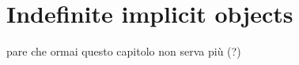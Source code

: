\setchapterpreamble[u]{\margintoc}
\chapter{Indefinite implicit objects}

pare che ormai questo capitolo non serva più (?)